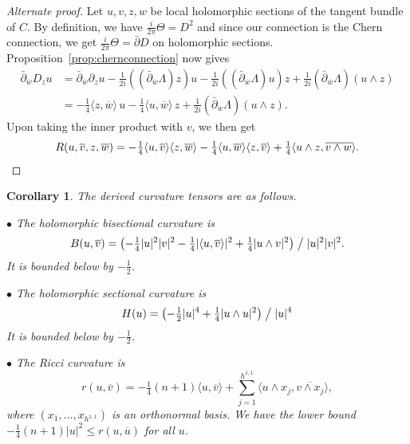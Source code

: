 \documentclass[11pt,a4paper]{amsart}
\newtheorem{coro}[theo]{Corollary}
\theoremstyle{definition}
\theoremstyle{remark}
\def\ov#1{\overline{#1}}
\def\d{\partial}
\def\dbar{\bar\partial}
\def\met#1#2{\langle #1, \ov{#2} \rangle}
\def\Lef{\Lambda}
\def\chern{D}
\def\curv{\tfrac{i}{2\pi}\Theta}
\def\ton{u}
\def\ttw{v}
\def\tth{z}
\def\tfo{w}
\def\KC{C}
\begin{document}
\begin{proof}[Alternate proof]
Let $\ton,\ttw,\tth,\tfo$ be local holomorphic sections of the tangent
bundle of $\KC$.  By definition, we have $\curv = \chern^2$ and since
our connection is the Chern connection, we get $\curv = \dbar \chern$ on
holomorphic sections. Proposition~\ref{prop:chernconnection} now gives
\begin{align*}
\dbar_{\ov\tfo} \chern_{\tth} \ton
&=
\dbar_{\ov\tfo} \d_{\tth}\ton
- \tfrac{1}{2i} ((\dbar_{\ov\tfo}\Lef) \tth)\ton
- \tfrac{1}{2i} ((\dbar_{\ov\tfo}\Lef) \ton)\tth
+ \tfrac{1}{2i} (\dbar_{\ov\tfo}\Lef)(\ton\wedge\tth)
\\
&=
- \tfrac{1}{4} \langle \tth,\ov{\tfo} \rangle\, \ton
- \tfrac{1}{4} \langle \ton, \ov{\tfo} \rangle\, \tth
+ \tfrac{1}{2i} (\dbar_{\ov\tfo}\Lef)(\ton \wedge \tth).
\end{align*}
Upon taking the inner product with $\ttw$, we then get
$$
R(\ton,\ov\ttw,\tth,\ov\tfo)
= -\tfrac14
\langle \ton, \ov\ttw \rangle
\langle \tth,\ov{\tfo} \rangle
-\tfrac14
\langle \ton, \ov{\tfo} \rangle
\langle \tth, \ov\ttw \rangle
+ \tfrac{1}{4} \langle \ton \wedge \tth, \ov{\ttw \wedge \tfo}\rangle.
\qedhere
$$
\end{proof}


\begin{coro}
The derived curvature tensors are as follows.

\smallskip
\noindent
$\bullet$
The holomorphic bisectional curvature is
$$
B(\ton,\ov\ttw) 
= 
\bigl(-\tfrac14 |\ton|^2 |\ttw|^2
- \tfrac14 |\met{\ton}{\ttw}|^2
+ \tfrac14 |\ton \wedge \ttw|^2
\bigr)
\bigm/
|\ton|^2|\ttw|^2.
$$
It is bounded below by $-\frac12$.

\smallskip
\noindent
$\bullet$
The holomorphic sectional curvature is
$$
H(\ton) 
=
\bigl(
-\tfrac12 |\ton|^4
+\tfrac14 |\ton \wedge \ton|^2
\bigr)
\bigm/
|\ton|^4
$$
It is bounded below by $-\frac12$.

\smallskip
\noindent
$\bullet$
The Ricci curvature is
$$
r(\ton, \ov\ttw) 
=
-\tfrac14(n+1) \met{\ton}{\ttw}
+ \sum_{j=1}^{h^{1,1}} \met{\ton\wedge x_j}{\ttw \wedge x_j},
$$
where $(x_1,\ldots,x_{h^{1,1}})$ is an orthonormal basis.
We have the lower bound 
$-\frac14(n+1)|\ton|^2 \leq r(\ton,\ov\ton)$ for all $\ton$.
\end{coro}
\end{document}
